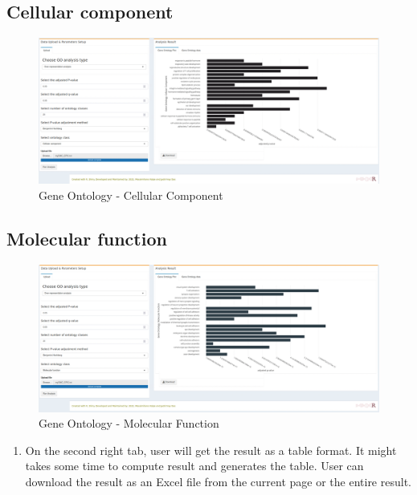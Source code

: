 \documentclass[
  a4paper,
  oneside,
  open=any]{scrreport}
\providecommand{\tightlist}{%
  \setlength{\itemsep}{0pt}\setlength{\parskip}{0pt}}\usepackage{longtable,booktabs,array}
\begin{document}
\hypertarget{cellular-component}{%
\subsection{Cellular component}\label{cellular-component}}

\begin{figure}[H]

{\centering \includegraphics{./images/GO-CC.png}

}

\caption{Gene Ontology - Cellular Component}

\end{figure}

\hypertarget{molecular-function}{%
\subsection{Molecular function}\label{molecular-function}}

\begin{figure}[H]

{\centering \includegraphics{./images/GO-MF.png}

}

\caption{Gene Ontology - Molecular Function}

\end{figure}

\begin{enumerate}
\def\labelenumi{\arabic{enumi}.}
\setcounter{enumi}{1}
\tightlist
\item
  On the second right tab, user will get the result as a table format.
  It might takes some time to compute result and generates the table.
  User can download the result as an Excel file from the current page or
  the entire result.\\
\end{enumerate}
\end{document}

